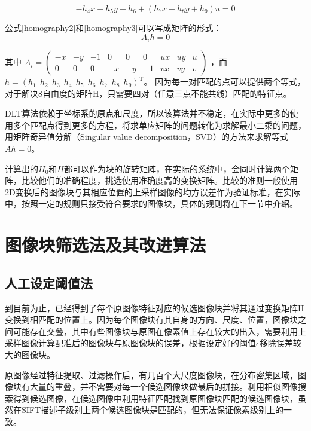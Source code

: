 \begin{equation}
\label{homography3}
-h_4x - h_5y - h_6 + (h_7x+h_8y+h_9)u = 0
\end{equation}

公式\eqref{homography2}和\eqref{homography3}可以写成矩阵的形式：
\begin{equation}
\label{homography4}
A_ih = 0
\end{equation}

其中
\(A_i = 
\begin{pmatrix}
-x & -y & -1 & 0 & 0 & 0 &ux & uy & u \\
0 & 0 & 0 & -x & -y & -1 &vx & vy & v 
\end{pmatrix}\)
，而
\(h = (h_1 \ \ h_2 \ \ h_3 \ \ h_4 \ \ h_5 \ \ h_6 \ \ h_7 \ \ h_8 \ \ h_9)^\mathrm{T}\)。
因为每一对匹配的点可以提供两个等式，对于解决8自由度的矩阵H，只需要四对（任意三点不能共线）匹配的特征点。

DLT算法依赖于坐标系的原点和尺度，所以该算法并不稳定，在实际中更多的使用多个匹配点得到更多的方程，将求单应矩阵的问题转化为求解最小二乘的问题，用矩阵奇异值分解（Singular value decomposition，SVD）的方法来求解等式\(Ah = 0\)。

计算出的\(H_0\)和\(H\)都可以作为块的旋转矩阵，在实际的系统中，会同时计算两个矩阵，比较他们的准确程度，挑选使用准确度高的变换矩阵。比较的准则一般使用2D变换后的图像块与其相应位置的上采样图像的均方误差作为验证标准，在实际中，按照一定的规则只接受符合要求的图像块，具体的规则将在下一节中介绍。

\section{图像块筛选法及其改进算法}
\subsection{人工设定阈值法}
到目前为止，已经得到了每个原图像特征对应的候选图像块并将其通过变换矩阵H变换到相匹配的位置上。因为每个图像块有其自身的方向、尺度、位置，图像块之间可能存在交叠，其中有些图像块与原图在像素值上存在较大的出入，需要利用上采样图像计算配准后的图像块与原图像块的误差，根据设定好的阈值\(\epsilon\)移除误差较大的图像块。

原图像经过特征提取、过滤操作后，有几百个大尺度图像块，在分布密集区域，图像块有大量的重叠，并不需要对每一个候选图像块做最后的拼接。利用相似图像搜索得到候选图像，在候选图像中利用特征匹配找到原图像块匹配的候选图像块，虽然在SIFT描述子级别上两个候选图像块是匹配的，但无法保证像素级别上的一致。

